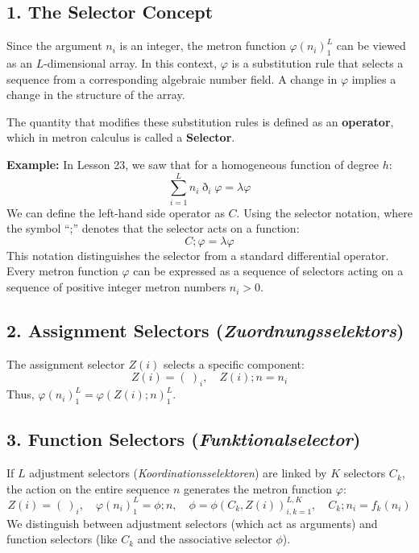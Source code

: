 \documentclass[11pt,a4paper,oneside]{article}
\begin{document}
\subsection{1. The Selector Concept}

Since the argument $n_i$ is an integer, the metron function $\varphi(n_i)_1^L$ can be viewed as an $L$-dimensional array. In this context, $\varphi$ is a substitution rule that selects a sequence from a corresponding algebraic number field. A change in $\varphi$ implies a change in the structure of the array.

The quantity that modifies these substitution rules is defined as an \textbf{operator}, which in metron calculus is called a \textbf{Selector}.

\textbf{Example:} In Lesson 23, we saw that for a homogeneous function of degree $h$:
\begin{equation*}
    \sum_{i=1}^L n_i \eth_i \varphi = \lambda \varphi
\end{equation*}
We can define the left-hand side operator as $C$. Using the selector notation, where the symbol ``;'' denotes that the selector acts on a function:
\begin{equation}
    C; \varphi = \lambda \varphi
\end{equation}
This notation distinguishes the selector from a standard differential operator. Every metron function $\varphi$ can be expressed as a sequence of selectors acting on a sequence of positive integer metron numbers $n_i > 0$.

\subsection{2. Assignment Selectors (\textit{Zuordnungsselektors})}
The assignment selector $Z(i)$ selects a specific component:
\begin{equation*}
    Z(i) = (\ )_i, \quad Z(i); n = n_i
\end{equation*}
Thus, $\varphi(n_i)_1^L = \varphi(Z(i); n)_1^L$.

\subsection{3. Function Selectors (\textit{Funktionalselector})}
If $L$ adjustment selectors (\textit{Koordinationsselektoren}) are linked by $K$ selectors $C_k$, the action on the entire sequence $n$ generates the metron function $\varphi$:
\begin{equation}
    Z(i) = (\ )_i, \quad \varphi(n_i)_1^L = \phi; n, \quad \phi = \phi(C_k, Z(i))_{i,k=1}^{L,K}, \quad C_k; n_i = f_k(n_i) \tag{M11}
\end{equation}
We distinguish between adjustment selectors (which act as arguments) and function selectors (like $C_k$ and the associative selector $\phi$).
\end{document}
